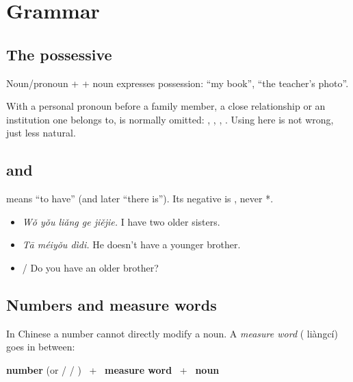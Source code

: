 \section{Grammar}

\subsection{The possessive }

Noun/pronoun +  + noun expresses possession:  ``my book'',
 ``the teacher's photo''.

\begin{important}
With a personal pronoun before a family member, a close relationship or an institution
one belongs to,  is normally omitted:
, , , . Using  here is not wrong, just
less natural.
\end{important}

\subsection{ and }

 means ``to have'' (and later ``there is''). Its negative is , never
*.
\begin{itemize}
  \item {} \emph{Wǒ yǒu liǎng ge jiějie.} I have two older sisters.
  \item {} \emph{Tā méiyǒu dìdi.} He doesn't have a younger brother.
  \item {} /  Do you have an older brother?
\end{itemize}

\subsection{Numbers and measure words}

In Chinese a number cannot directly modify a noun. A \emph{measure word} (
liàngcí) goes in between:
\begin{center}
\textbf{number} (or  /  / ) \ + \ \textbf{measure word} \ + \ \textbf{noun}
\end{center}

